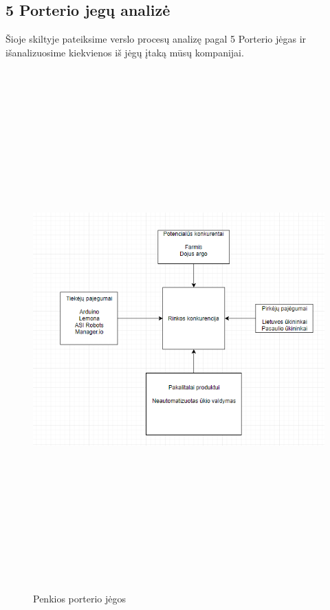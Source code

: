 \documentclass[oneside]{VUMIFPSkursinis}
\begin{document}
	\subsection{5 Porterio jegų analizė}
	Šioje skiltyje pateiksime verslo procesų analizę pagal 5 Porterio jėgas ir išanalizuosime kiekvienos iš jėgų įtaką mūsų kompanijai.
	\begin{figure}[H]
		\centering	
	\includegraphics[width=18cm,height=20cm,keepaspectratio]{Porteris.png}
	\caption{Penkios porterio jėgos}
	\label{fig:PorterisPenki}
\end{figure}
\end{document}
